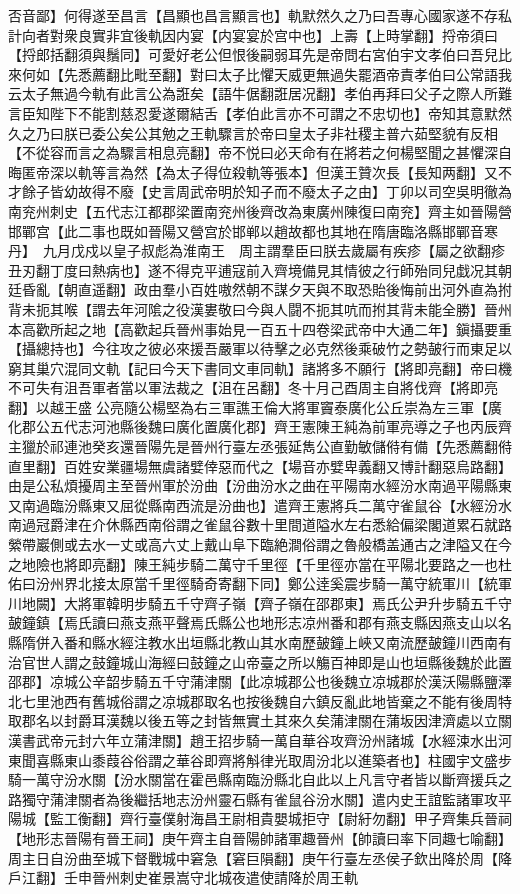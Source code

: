 否音鄙】何得遂至昌言【昌顯也昌言顯言也】軌默然久之乃曰吾專心國家遂不存私計向者對衆良實非宜後軌因内宴【内宴宴於宫中也】上壽【上時掌翻】捋帝須曰【捋郎括翻須與鬚同】可愛好老公但恨後嗣弱耳先是帝問右宮伯宇文孝伯曰吾兒比來何如【先悉薦翻比毗至翻】對曰太子比懼天威更無過失罷酒帝責孝伯曰公常語我云太子無過今軌有此言公為誑矣【語牛倨翻誑居况翻】孝伯再拜曰父子之際人所難言臣知陛下不能割慈忍愛遂爾結舌【孝伯此言亦不可謂之不忠切也】帝知其意默然久之乃曰朕已委公矣公其勉之王軌驟言於帝曰皇太子非社稷主普六茹堅貌有反相【不從容而言之為驟言相息亮翻】帝不悦曰必天命有在將若之何楊堅聞之甚懼深自晦匿帝深以軌等言為然【為太子得位殺軌等張本】但漢王贊次長【長知两翻】又不才餘子皆幼故得不廢【史言周武帝明於知子而不廢太子之由】丁卯以司空吳明徹為南兖州刺史【五代志江都郡梁置南兖州後齊改為東廣州陳復曰南兖】齊主如晉陽營邯鄲宫【此二事也既如晉陽又營宫於邯郸以趙故都也其地在隋唐臨洛縣邯鄲音寒丹】　九月戊戍以皇子叔彪為淮南王　周主謂羣臣曰朕去歲屬有疾疹【屬之欲翻疹丑刃翻丁度曰熱病也】遂不得克平逋寇前入齊境備見其情彼之行師殆同兒戱况其朝廷昏亂【朝直遥翻】政由羣小百姓嗷然朝不謀夕天與不取恐貽後悔前出河外直為拊背未扼其喉【謂去年河隂之役漢婁敬曰今與人闘不扼其吭而拊其背未能全勝】晉州本高歡所起之地【高歡起兵晉州事始見一百五十四卷梁武帝中大通二年】鎭攝要重【攝總持也】今往攻之彼必來援吾嚴軍以待擊之必克然後乘破竹之勢皷行而東足以窮其巢穴混同文軌【記曰今天下書同文車同軌】諸將多不願行【將即亮翻】帝曰機不可失有沮吾軍者當以軍法裁之【沮在呂翻】冬十月己酉周主自將伐齊【將即亮翻】以越王盛公亮隨公楊堅為右三軍譙王倫大將軍竇泰廣化公丘崇為左三軍【廣化郡公五代志河池縣後魏曰廣化置廣化郡】齊王憲陳王純為前軍亮導之子也丙辰齊主獵於祁連池癸亥還晉陽先是晉州行臺左丞張延雋公直勤敏儲偫有備【先悉薦翻偫直里翻】百姓安業疆場無虞諸嬖倖惡而代之【場音亦嬖卑義翻又博計翻惡烏路翻】由是公私煩擾周主至晉州軍於汾曲【汾曲汾水之曲在平陽南水經汾水南過平陽縣東又南過臨汾縣東又屈從縣南西流是汾曲也】遣齊王憲將兵二萬守雀鼠谷【水經汾水南過冠爵津在介休縣西南俗謂之雀鼠谷數十里間道隘水左右悉給偏梁閣道累石就路縈帶巖側或去水一丈或高六丈上戴山阜下臨絶澗俗謂之魯般橋盖通古之津隘又在今之地險也將即亮翻】陳王純步騎二萬守千里徑【千里徑亦當在平陽北要路之一也杜佑曰汾州界北接太原當千里徑騎奇寄翻下同】鄭公逹奚震步騎一萬守統軍川【統軍川地闕】大將軍韓明步騎五千守齊子嶺【齊子嶺在邵郡東】焉氏公尹升步騎五千守皷鐘鎮【焉氏讀曰燕支燕平聲焉氏縣公也地形志凉州番和郡有燕支縣因燕支山以名縣隋併入番和縣水經注教水出垣縣北教山其水南歷皷鐘上峽又南流歷皷鐘川西南有治官世人謂之鼓鐘城山海經曰鼓鐘之山帝臺之所以觴百神即是山也垣縣後魏於此置邵郡】凉城公辛韶步騎五千守蒲津關【此凉城郡公也後魏立凉城郡於漢沃陽縣鹽澤北七里池西有舊城俗謂之凉城郡取名也按後魏自六鎮反亂此地皆棄之不能有後周特取郡名以封爵耳漢魏以後五等之封皆無實土其來久矣蒲津關在蒲坂因津濟處以立關漢書武帝元封六年立蒲津關】趙王招步騎一萬自華谷攻齊汾州諸城【水經涑水出河東聞喜縣東山黍葭谷俗謂之華谷即齊將斛律光取周汾北以進築者也】柱國宇文盛步騎一萬守汾水關【汾水關當在霍邑縣南臨汾縣北自此以上凡言守者皆以斷齊援兵之路獨守蒲津關者為後繼括地志汾州靈石縣有雀鼠谷汾水關】遣内史王誼監諸軍攻平陽城【監工衡翻】齊行臺僕射海昌王尉相貴嬰城拒守【尉紆勿翻】甲子齊集兵晉祠【地形志晉陽有晉王祠】庚午齊主自晉陽帥諸軍趣晉州【帥讀曰率下同趣七喻翻】周主日自汾曲至城下督戰城中窘急【窘巨隕翻】庚午行臺左丞侯子欽出降於周【降戶江翻】壬申晉州刺史崔景嵩守北城夜遣使請降於周王軌
